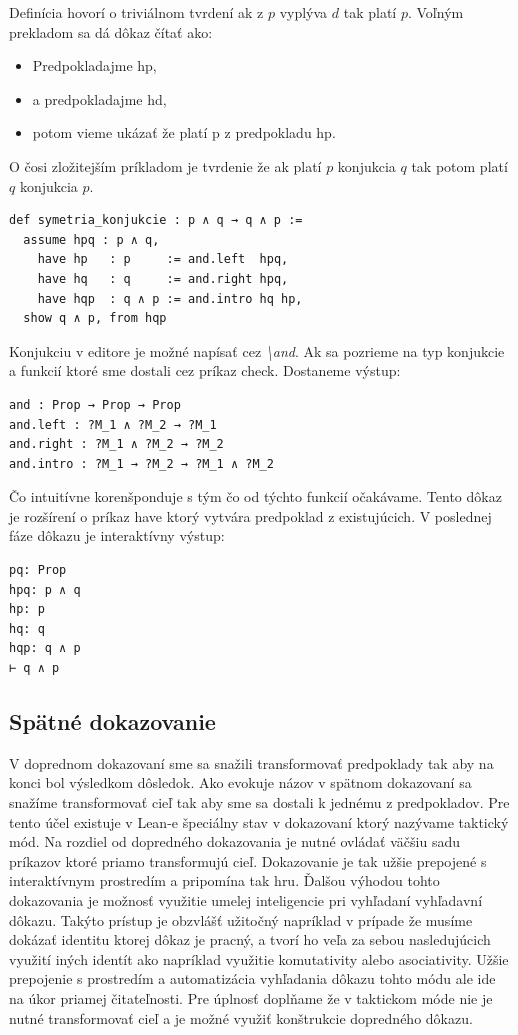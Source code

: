 \documentclass[a4paper,10pt,oneside]{report}%
\begin{document}
    Definícia hovorí o triviálnom tvrdení ak z $p$ vyplýva $d$ tak platí $p$. Voľným
prekladom sa dá dôkaz čítať ako:

\begin{itemize}
    \item Predpokladajme hp,
    \item a predpokladajme hd,
    \item potom vieme ukázať že platí p z predpokladu hp.
\end{itemize}

    O čosi zložitejším príkladom je tvrdenie že ak platí $p$ konjukcia $q$ tak potom
platí $q$ konjukcia $p$.

\begin{lstlisting}
def symetria_konjukcie : p ∧ q → q ∧ p :=
  assume hpq : p ∧ q,
    have hp   : p     := and.left  hpq,
    have hq   : q     := and.right hpq,
    have hqp  : q ∧ p := and.intro hq hp,
  show q ∧ p, from hqp
\end{lstlisting}

    Konjukciu v editore je možné napísať cez \emph{\textbackslash and}.
    Ak sa pozrieme na typ konjukcie a funkcií ktoré sme dostali cez príkaz check.
    Dostaneme výstup:

\begin{lstlisting}
and : Prop → Prop → Prop
and.left : ?M_1 ∧ ?M_2 → ?M_1
and.right : ?M_1 ∧ ?M_2 → ?M_2
and.intro : ?M_1 → ?M_2 → ?M_1 ∧ ?M_2
\end{lstlisting}

    Čo intuitívne korenšponduje s tým čo od týchto funkcií očakávame.
    Tento dôkaz je rozšírení o príkaz have ktorý vytvára predpoklad z existujúcich.
    V poslednej fáze dôkazu je interaktívny výstup:

\begin{lstlisting}
pq: Prop
hpq: p ∧ q
hp: p
hq: q
hqp: q ∧ p
⊢ q ∧ p
\end{lstlisting}

\subsection{Spätné dokazovanie}

V doprednom dokazovaní sme sa snažili transformovať predpoklady tak aby na konci
    bol výsledkom dôsledok.
Ako evokuje názov v spätnom dokazovaní sa snažíme transformovať cieľ tak aby sme
    sa dostali k jednému z predpokladov.
Pre tento účel existuje v Lean-e špeciálny stav v dokazovaní ktorý nazývame taktický
    mód.
Na rozdiel od dopredného dokazovania je nutné ovládať väčšiu sadu príkazov ktoré
    priamo transformujú cieľ.
Dokazovanie je tak užšie prepojené s interaktívnym prostredím a pripomína tak hru.
Ďalšou výhodou tohto dokazovania je možnosť využitie umelej inteligencie pri vyhľadaní
vyhľadavní dôkazu.
Takýto prístup je obzvlášť užitočný napríklad v prípade že musíme dokázať identitu
    ktorej dôkaz je pracný, a tvorí ho veľa za sebou nasledujúcich využití iných
    identít ako napríklad využitie komutativity alebo asociativity.
Užšie prepojenie s prostredím a automatizácia vyhľadania dôkazu tohto módu ale
    ide na úkor priamej čitateľnosti.
Pre úplnosť doplňame že v taktickom móde nie je nutné transformovať cieľ a je možné
    využiť konštrukcie dopredného dôkazu.
\end{document}
